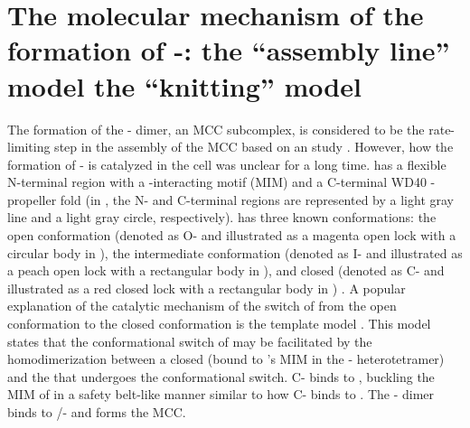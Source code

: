 \section{The molecular mechanism of the formation of -: the ``assembly line'' model  the ``knitting'' model}
\label{TwoModels}


The formation of the - dimer, an MCC subcomplex, is considered to be the rate-limiting step in the assembly of the MCC based on an  study \cite{Faesen2017}. However, how the formation of - is catalyzed in the cell was unclear for a long time.  has a flexible N-terminal region with a -interacting motif (MIM) and a C-terminal WD40 \textbeta{}-propeller fold \cite{CDC20-KEN} (in , the N- and C-terminal regions are represented by a light gray line and a light gray circle, respectively).  has three known conformations: the open conformation (denoted as O- and illustrated as a magenta open lock with a circular body in ), the intermediate conformation (denoted as I- and illustrated as a peach open lock with a rectangular body in ), and closed (denoted as C- and illustrated as a red closed lock with a rectangular body in ) \cite{I-MAD2}. A popular explanation of the catalytic mechanism of the switch of  from the open conformation to the closed conformation is the template model \cite{TemplateModel}. This model states that the conformational switch of  may be facilitated by the homodimerization between a closed  (bound to 's MIM in the - heterotetramer) and the  that undergoes the conformational switch. C- binds to , buckling the MIM of  in a safety belt-like manner similar to how C- binds to  \cite{Structure1GO4, SpMCC}. The - dimer binds to /- and forms the MCC.

